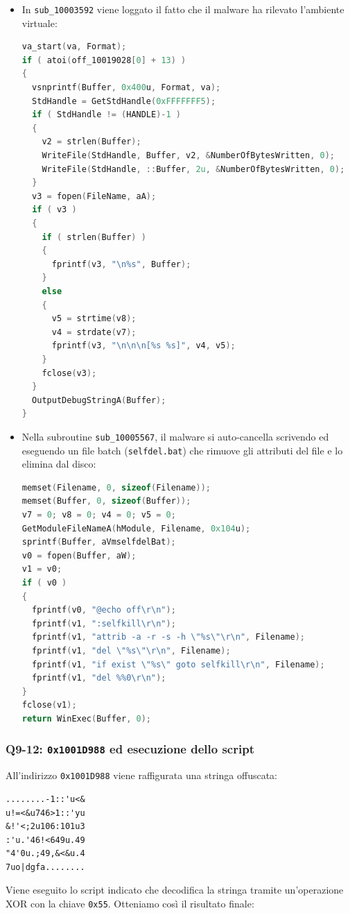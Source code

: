 \begin{itemize}
  \item In \texttt{sub\_10003592} viene loggato il fatto che il malware ha rilevato l'ambiente virtuale:
\begin{lstlisting}[language=C]
va_start(va, Format);
if ( atoi(off_10019028[0] + 13) )
{
  vsnprintf(Buffer, 0x400u, Format, va);
  StdHandle = GetStdHandle(0xFFFFFFF5);
  if ( StdHandle != (HANDLE)-1 )
  {
    v2 = strlen(Buffer);
    WriteFile(StdHandle, Buffer, v2, &NumberOfBytesWritten, 0);
    WriteFile(StdHandle, ::Buffer, 2u, &NumberOfBytesWritten, 0);
  }
  v3 = fopen(FileName, aA);
  if ( v3 )
  {
    if ( strlen(Buffer) )
    {
      fprintf(v3, "\n%s", Buffer);
    }
    else
    {
      v5 = strtime(v8);
      v4 = strdate(v7);
      fprintf(v3, "\n\n\n[%s %s]", v4, v5);
    }
    fclose(v3);
  }
  OutputDebugStringA(Buffer);
}
\end{lstlisting}

  \item Nella subroutine \texttt{sub\_10005567}, il malware si auto-cancella scrivendo ed eseguendo un file batch (\texttt{selfdel.bat}) che rimuove gli attributi del file e lo elimina dal disco:
\begin{lstlisting}[language=C]
memset(Filename, 0, sizeof(Filename));
memset(Buffer, 0, sizeof(Buffer));
v7 = 0; v8 = 0; v4 = 0; v5 = 0;
GetModuleFileNameA(hModule, Filename, 0x104u);
sprintf(Buffer, aVmselfdelBat);
v0 = fopen(Buffer, aW);
v1 = v0;
if ( v0 )
{
  fprintf(v0, "@echo off\r\n");
  fprintf(v1, ":selfkill\r\n");
  fprintf(v1, "attrib -a -r -s -h \"%s\"\r\n", Filename);
  fprintf(v1, "del \"%s\"\r\n", Filename);
  fprintf(v1, "if exist \"%s\" goto selfkill\r\n", Filename);
  fprintf(v1, "del %%0\r\n");
}
fclose(v1);
return WinExec(Buffer, 0);
\end{lstlisting}
\end{itemize}

\subsubsection{Q9-12: \texttt{0x1001D988} ed esecuzione dello script}

All'indirizzo \texttt{0x1001D988} viene raffigurata una stringa offuscata:
\begin{verbatim}
........-1::'u<&
u!=<&u746>1::'yu
&!'<;2u106:101u3
:'u.'46!<649u.49
"4'0u.;49,&<&u.4
7uo|dgfa........
\end{verbatim}

Viene eseguito lo script indicato che decodifica la stringa tramite un'operazione XOR con la chiave \texttt{0x55}. Otteniamo così il risultato finale:

